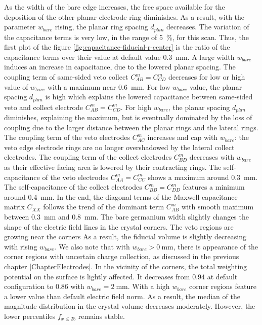As the width of the bare edge increases, the free space available for the deposition of the other planar electrode ring diminishes. As a result, with the parameter $w_{bare}$ rising, the planar ring spacing $d_{plan}$ decreases.  
The variation of the capacitance terms is very low, in the range of \SI{5}{\percent}, for this scan. Thus, the first plot of the figure \ref{fig:capacitance-fiducial-r-center} is the ratio of the capacitance terms over their value at default value \SI{0.3}{\mm}. A large width $w_{bare}$ induces an increase in capacitance, due to the lowered planar spacing.
The coupling term of same-sided veto collect $C_{AB}^m=C_{CD}^m$ decreases for low or high value of $w_{bare}$ with a maximum near \SI{0.6}{\mm}. For low $w_{bare}$ value, the planar spacing $d_{plan}$ is high which explains the lowered capacitance between same-sided veto and collect electrode $C_{AB}^m=C_{CD}^m$. For high $w_{bare}$, the planar spacing $d_{plan}$ diminishes, explaining the maximum, but is eventually dominated by the loss of coupling due to the larger distance between the planar rings and the lateral rings. The coupling term of the veto electrodes $C_{AC}^m$ increases and cap with $w_{bare}$: the veto edge electrode rings are no longer overshadowed by the lateral collect electrodes. The coupling term of the collect electrodes $C_{BD}^m$ decreases with $w_{bare}$ as their effective facing area is lowered by their contracting rings. The self-capacitance of the veto electrodes $C_{AA}^m = C_{CC}^m$ shows a maximum around \SI{0.3}{\mm}. The self-capacitance of the collect electrodes $C_{BB}^m = C_{DD}^m$ features a minimum around \SI{0.4}{\mm}. In the end, the diagonal terms of the Maxwell capacitance matrix $C_{XX}$ follows the trend of the dominant term $C_{AB}^m$ with smooth maximum between 
\SI{0.3}{\mm} and \SI{0.8}{\mm}.
The bare germanium width slightly changes the shape of the electric field lines in the crystal corners. The veto regions are growing near the corners As a result, the fiducial volume is slightly decreasing with rising $w_{bare}$. We also note that with $w_{bare} > \SI{0}{\mm}$, there is appearance of the corner regions with uncertain charge collection, as discussed in the previous chapter \ref{ChapterElectrodes}. 
In the vicinity of the corners, the total weighting potential on the surface is lightly affected. It decreases from $0.94$ at default configuration to $0.86$ with $w_{bare} = \SI{2}{\mm}$.
With a high $w_{bare}$ corner regions feature a lower value than default electric field norm. As a result, the median of the magnitude distribution in the crystal volume decreases moderately. However, the lower percentiles $f_{x \leq 25}$ remains stable.

